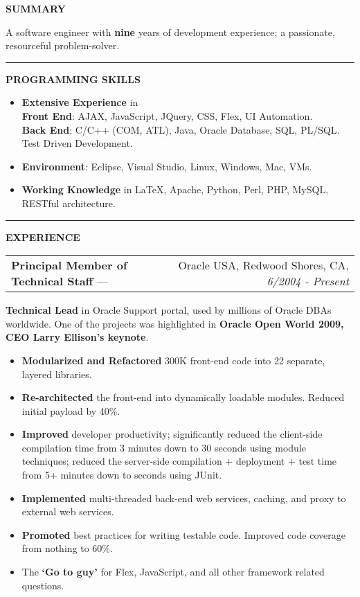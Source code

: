 \documentclass[11pt]{article}
\makeatletter
\newcommand{\resheading}[1]{\vspace{1pt}\textbf{#1}}
\newcommand{\ressubheading}[4]{\vspace{6pt}
\begin{tabular*}{\textwidth}{@{}l@{\extracolsep{\fill}}r@{}}
\textbf{#1} --- & #3, #2, \textit{#4} \\
\end{tabular*}}
\newcommand{\ressubsubheading}[1]{\vspace{6pt}#1}
\newcommand{\resitem}[1]{\item #1}
\newcommand{\ressep}{\vspace{6pt}\hrule\vspace{3pt}}
\makeatother
\begin{document}
\resheading{SUMMARY}

A software engineer with \textbf{nine} years of development experience; a passionate, resourceful problem-solver.
\ressep{}

\resheading{PROGRAMMING SKILLS}

\begin{itemize}
\resitem{\textbf{Extensive Experience} in \\
	\textbf{Front End}: AJAX, JavaScript, JQuery, CSS, Flex, UI Automation.\\
	\textbf{Back End}: C/C++ (COM, ATL), Java, Oracle Database, SQL, PL/SQL. Test Driven Development.}
\resitem{\textbf{Environment}: Eclipse, Visual Studio, Linux, Windows, Mac, VMs.}
\resitem{\textbf{Working Knowledge} in \LaTeX, Apache, Python, Perl, PHP, MySQL, RESTful architecture.}
\end{itemize}

\ressep{}
\resheading{EXPERIENCE}

\ressubheading{Principal Member of Technical Staff}{Redwood Shores, CA}{Oracle USA}{6/2004 - Present}

\ressubsubheading{\textbf{Technical Lead} in Oracle Support portal, used by millions of Oracle DBAs worldwide.
One of the projects was highlighted in \textbf{Oracle Open World 2009, CEO Larry Ellison's keynote}.}

\begin{itemize}
\resitem{\textbf{Modularized and Refactored} 300K front-end code into 22 separate, layered libraries.}
\resitem{\textbf{Re-architected} the front-end into dynamically loadable modules. Reduced initial payload by 40\%.}
\resitem{\textbf{Improved} developer productivity; significantly reduced the client-side compilation time from 3 minutes down to 30 seconds using module techniques; reduced the server-side compilation + deployment + test time from 5+ minutes down to seconds using JUnit.}
\resitem{\textbf{Implemented} multi-threaded back-end web services, caching, and proxy to external web services.}
\resitem{\textbf{Promoted} best practices for writing testable code. Improved code coverage from nothing to 60\%.}
\resitem{The \textbf{`Go to guy'} for Flex, JavaScript, and all other framework related questions.}
\end{itemize}
\end{document}
